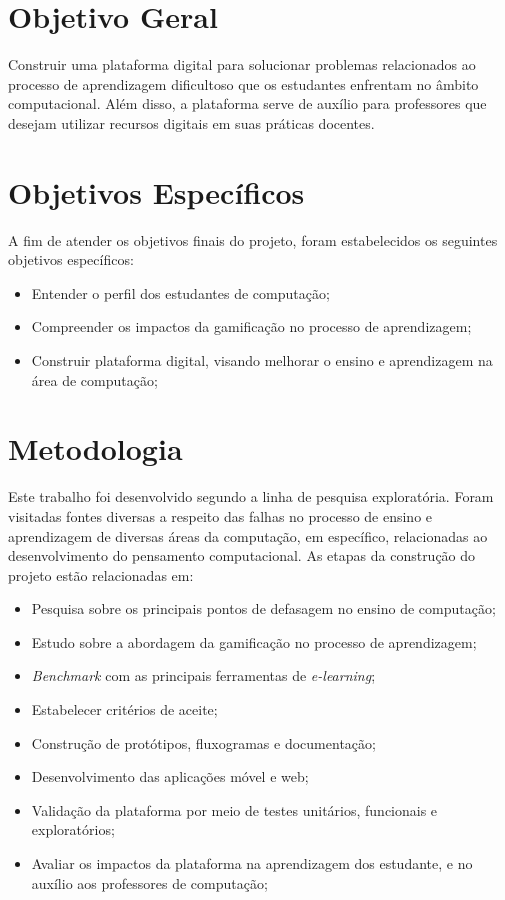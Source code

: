 \section{Objetivo Geral}
Construir uma plataforma digital para solucionar problemas relacionados ao processo de aprendizagem dificultoso que os estudantes enfrentam no âmbito computacional. Além disso, a plataforma serve de auxílio para professores que desejam utilizar recursos digitais em suas práticas docentes.

\section{Objetivos Específicos}
A fim de atender os objetivos finais do projeto, foram estabelecidos os seguintes objetivos específicos:
 \begin{itemize}
   \item Entender o perfil dos estudantes de computação;
   \item Compreender os impactos da gamificação no processo de aprendizagem;
   \item Construir plataforma digital, visando melhorar o ensino e aprendizagem na área de computação;
 \end{itemize}

\section{Metodologia}
Este trabalho foi desenvolvido segundo a linha de pesquisa exploratória. Foram visitadas fontes diversas a respeito das falhas no processo de ensino e aprendizagem de diversas áreas da computação, em específico, relacionadas ao desenvolvimento do pensamento computacional. As etapas da construção do projeto estão relacionadas em:

 \begin{itemize}
   \item Pesquisa sobre os principais pontos de defasagem no ensino de computação;
   \item Estudo sobre a abordagem da gamificação no processo de aprendizagem;
   \item \textit{Benchmark} com as principais ferramentas de \textit{e-learning};
   \item Estabelecer critérios de aceite; 
   \item Construção de protótipos, fluxogramas e documentação;
   \item Desenvolvimento das aplicações móvel e web;
   \item Validação da plataforma por meio de testes unitários, funcionais e exploratórios;
   \item Avaliar os impactos da plataforma na aprendizagem dos estudante, e no auxílio aos professores de computação;
 \end{itemize}

